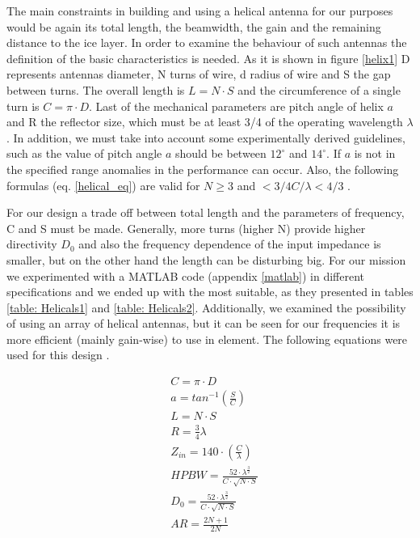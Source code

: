 The main constraints in building and using a helical antenna for our purposes would be again its total length, the beamwidth, the gain and the remaining distance to the ice layer. In order to examine the behaviour of such antennas the definition of the basic characteristics is needed. As it is shown in figure \ref{helix1} D represents antennas diameter, N turns of wire, d radius of wire and S the gap between turns. The overall length is $L=N \cdot S$ and the circumference of a single turn is $C=\pi \cdot D$. Last of the mechanical parameters are pitch angle of helix $a$ and R the reflector size, which must be at least 3/4 of the operating wavelength $\lambda$. In addition, we must take into account some experimentally derived guidelines, such as the value of pitch angle $a$ should be between $12^\circ$ and $14^\circ$. If $a$ is not in the specified range anomalies in the performance can occur. Also, the following formulas (eq. \ref{helical_eq}) are valid for $N \geq 3$ and $<3/4C/\lambda<4/3$ \cite{balanis2}.

For our design a trade off between total length and the parameters of frequency, C and S must be made. Generally, more turns (higher N) provide higher directivity $D_{0}$ and also the frequency dependence of the input impedance is smaller, but on the other hand the length can be disturbing big. For our mission we experimented with a MATLAB code (appendix \ref{matlab}) in different specifications and we ended up with the most suitable, as they presented in tables \ref{table: Helicals1} and \ref{table: Helicals2}. Additionally, we examined the possibility of using an array of helical antennas, but it can be seen for our frequencies it is more efficient (mainly gain-wise) to use in element. The following equations were used for this design \cite{balanis2}.

\begin{subequations}
\begin{align}
    &C=\pi \cdot D \\
    &a=tan^{-1}(\frac{S}{C}) \\
    &L=N \cdot S \\
    &R=\frac{3}{4} \lambda \\
    &Z_{in}=140 \cdot (\frac{C}{\lambda}) \\
    &HPBW=\frac{52 \cdot \lambda^{\frac{3}{2}}}{C \cdot \sqrt{N \cdot S}} \\
    &D_{0}=\frac{52 \cdot \lambda^{\frac{3}{2}}}{C \cdot \sqrt{N \cdot S}} \\
    &AR=\frac{2N+1}{2N} 
\end{align}
\label{helical_eq}
\end{subequations}

